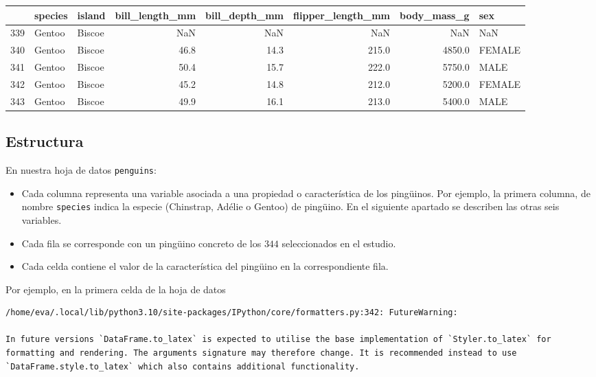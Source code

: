 \documentclass[
  a4paper,
  noprof,
  12pt,
  notoc,
  nosols,
  nobib]{mnye}
\providecommand{\tightlist}{%
  \setlength{\itemsep}{0pt}\setlength{\parskip}{0pt}}\usepackage{longtable,booktabs,array}
\theoremstyle{definition}
\theoremstyle{remark}
\begin{document}
\begin{tabular}{lllrrrrl}
\toprule
{} & species &  island &  bill\_length\_mm &  bill\_depth\_mm &  flipper\_length\_mm &  body\_mass\_g &     sex \\
\midrule
339 &  Gentoo &  Biscoe &             NaN &            NaN &                NaN &          NaN &     NaN \\
340 &  Gentoo &  Biscoe &            46.8 &           14.3 &              215.0 &       4850.0 &  FEMALE \\
341 &  Gentoo &  Biscoe &            50.4 &           15.7 &              222.0 &       5750.0 &    MALE \\
342 &  Gentoo &  Biscoe &            45.2 &           14.8 &              212.0 &       5200.0 &  FEMALE \\
343 &  Gentoo &  Biscoe &            49.9 &           16.1 &              213.0 &       5400.0 &    MALE \\
\bottomrule
\end{tabular}

\hypertarget{estructura}{%
\subsection{Estructura}\label{estructura}}

En nuestra hoja de datos \texttt{penguins}:

\begin{itemize}
\tightlist
\item
  Cada columna representa una variable asociada a una propiedad o
  característica de los pingüinos. Por ejemplo, la primera columna, de
  nombre \texttt{species} indica la especie (Chinstrap, Adélie o Gentoo)
  de pingüino. En el siguiente apartado se describen las otras seis
  variables.
\item
  Cada fila se corresponde con un pingüino concreto de los \(344\)
  seleccionados en el estudio.
\item
  Cada celda contiene el valor de la característica del pingüino en la
  correspondiente fila.
\end{itemize}

Por ejemplo, en la primera celda de la hoja de datos

\begin{verbatim}
/home/eva/.local/lib/python3.10/site-packages/IPython/core/formatters.py:342: FutureWarning:

In future versions `DataFrame.to_latex` is expected to utilise the base implementation of `Styler.to_latex` for formatting and rendering. The arguments signature may therefore change. It is recommended instead to use `DataFrame.style.to_latex` which also contains additional functionality.
\end{verbatim}
\end{document}
